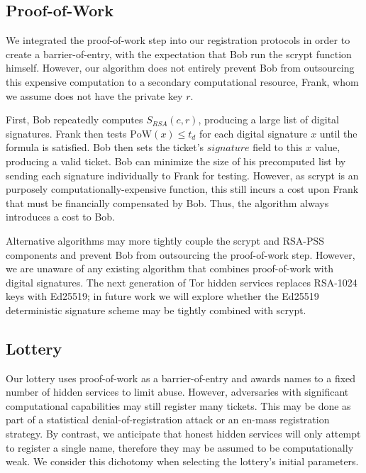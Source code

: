 \documentclass[USenglish,oneside,twocolumn]{article}
\begin{document}
\subsection{Proof-of-Work}
\label{sec:proofOfWork}


We integrated the proof-of-work step into our registration protocols in order to create a barrier-of-entry, with the expectation that Bob run the scrypt function himself. However, our algorithm does not entirely prevent Bob from outsourcing this expensive computation to a secondary computational resource, Frank, whom we assume does not have the private key $ r $. 

First, Bob repeatedly computes $ S_{\mathit{RSA}}(c, r) $, producing a large list of digital signatures. Frank then tests $ \mathrm{PoW}(x) \leq t_{d} $ for each digital signature $ x $ until the formula is satisfied. Bob then sets the ticket's $ \mathit{signature} $ field to this $ x $ value, producing a valid ticket. Bob can minimize the size of his precomputed list by sending each signature individually to Frank for testing. However, as scrypt is an purposely computationally-expensive function, this still incurs a cost upon Frank that must be financially compensated by Bob. Thus, the algorithm always introduces a cost to Bob.

Alternative algorithms may more tightly couple the scrypt and RSA-PSS components and prevent Bob from outsourcing the proof-of-work step. However, we are unaware of any existing algorithm that combines proof-of-work with digital signatures. The next generation of Tor hidden services \cite{TorProp224} replaces RSA-1024 keys with Ed25519; in future work we will explore whether the Ed25519 deterministic signature scheme may be tightly combined with scrypt. 

\subsection{Lottery}
\label{sec:lottery}

Our lottery uses proof-of-work as a barrier-of-entry and awards names to a fixed number of hidden services to limit abuse. However, adversaries with significant computational capabilities may still register many tickets. This may be done as part of a statistical denial-of-registration attack or an en-mass registration strategy. By contrast, we anticipate that honest hidden services will only attempt to register a single name, therefore they may be assumed to be computationally weak. We consider this dichotomy when selecting the lottery's initial parameters.
\end{document}
